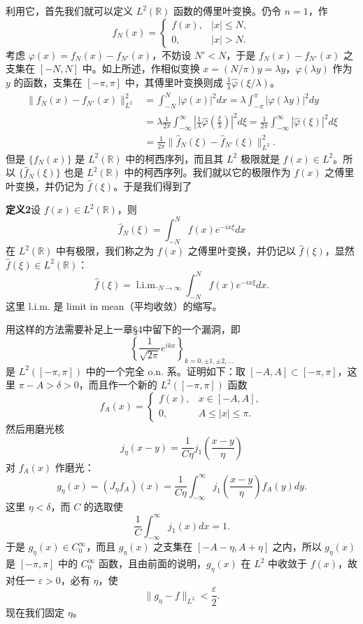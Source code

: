 利用它，首先我们就可以定义 $L^2(\mathbb R)$ 函数的傅里叶变换。仍令 $n=1$，作
\[
 f_N(x)=\begin{cases}f(x),&|x|\le N,\\0,&|x|>N.
 \end{cases}
\]
考虑 $\varphi(x)=f_N(x)-f_{N'}(x)$，不妨设 $N'<N$，于是 $f_N(x)-f_{N'}(x)$ 之支集在 $[-N,N]$ 中。如上所述，作相似变换 $x=(N/\pi)y=\lambda y$，$\varphi(\lambda y)$ 作为 $y$ 的函数，支集在 $[-\pi,\pi]$ 中，其傅里叶变换则成 $\frac1\lambda\widehat\varphi(\xi/\lambda)$。
\[
 \begin{aligned}
 \|f_N(x)-f_{N'}(x)\|_{L^2}^2
 &=\int_{-N}^{N}|\varphi(x)|^2dx
 =\lambda\int_{-\pi}^{\pi}|\varphi(\lambda y)|^2dy\\
 &=\lambda\frac1{2\pi}\int_{-\infty}^{\infty}
 \left|\frac1\lambda\widehat\varphi\!\left(\frac\xi\lambda\right)\right|^2d\xi
 =\frac1{2\pi}\int_{-\infty}^{\infty}|\widehat\varphi(\xi)|^2d\xi\\
 &=\frac1{2\pi}\|\widehat f_N(\xi)-\widehat f_{N'}(\xi)\|_{L^2}^2.
 \end{aligned}
\]
但是 $\{f_N(x)\}$ 是 $L^2(\mathbb R)$ 中的柯西序列，而且其 $L^2$ 极限就是 $f(x)\in L^2$。所以 $\{\widehat f_N(\xi)\}$ 也是 $L^2(\mathbb R)$ 中的柯西序列。我们就以它的极限作为 $f(x)$ 之傅里叶变换，并仍记为 $\widehat f(\xi)$。于是我们得到了

\noindent\textbf{定义2}\quad 设 $f(x)\in L^2(\mathbb R)$，则
\[
 \widehat f_N(\xi)=\int_{-N}^{N}f(x)e^{-ix\xi}dx
\]
在 $L^2(\mathbb R)$ 中有极限，我们称之为 $f(x)$ 之傅里叶变换，并仍记以 $\widehat f(\xi)$，显然 $\widehat f(\xi)\in L^2(\mathbb R)$：
\[
 \widehat f(\xi)=\operatorname{l.i.m.}_{N\to\infty}\int_{-N}^{N}f(x)e^{-ix\xi}dx.
\]
这里 l.i.m. 是 limit in mean（平均收敛）的缩写。

用这样的方法需要补足上一章\S4中留下的一个漏洞，即
\[
 \left\{\frac1{\sqrt{2\pi}}e^{ikx}\right\}_{k=0,\pm1,\pm2,\ldots}
\]
是 $L^2([ -\pi,\pi])$ 中的一个完全 o.n. 系。证明如下：取 $[-A,A]\subset[-\pi,\pi]$，这里 $\pi-A>\delta>0$，而且作一个新的 $L^2([ -\pi,\pi])$ 函数
\[
 f_A(x)=\begin{cases}f(x),&x\in[-A,A],\\0,&A\le|x|\le\pi.
 \end{cases}
\]
然后用磨光核
\[
 j_\eta(x-y)=\frac1{C\eta}j_1\!\left(\frac{x-y}{\eta}\right)
\]
对 $f_A(x)$ 作磨光：
\[
 g_\eta(x)=(J_\eta f_A)(x)=\frac1{C\eta}\int_{-\infty}^{\infty}
 j_1\!\left(\frac{x-y}{\eta}\right)f_A(y)dy.
\]
这里 $\eta<\delta$，而 $C$ 的选取使
\[
 \frac1C\int_{-\infty}^{\infty}j_1(x)dx=1.
\]
于是 $g_\eta(x)\in C_0^\infty$，而且 $g_\eta(x)$ 之支集在 $[-A-\eta,A+\eta]$ 之内，所以 $g_\eta(x)$ 是 $[-\pi,\pi]$ 中的 $C_0^\infty$ 函数，且由前面的说明，$g_\eta(x)$ 在 $L^2$ 中收敛于 $f(x)$，故对任一 $\varepsilon>0$，必有 $\eta$，使
\[
 \|g_\eta-f\|_{L^2}<\frac\varepsilon2.
\]
现在我们固定 $\eta$。


